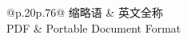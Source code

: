 \begin{XDUGlossary}{@{}p{.20\linewidth}p{.76\linewidth}@{}}
缩略语 & 英文全称 \\
\endhead
PDF & Portable Document Format \\
\end{XDUGlossary}
